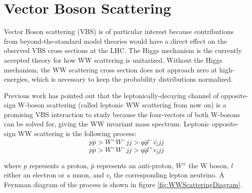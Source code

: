 \documentclass[10pt]{ucscthesisbs}
\begin{document}
\section{Vector Boson Scattering}
Vector Boson scattering (VBS) is of particular interest because contributions from beyond-the-standard model theories would have a direct effect on the observed VBS cross sections at the LHC. \cite{atlasnote2012} The Higgs mechanism is the currently accepted theory for how WW scattering is unitarized. Without the Higgs mechanism, the WW scattering cross section does not approach zero at high-energies, which is necessary to keep the probability distributions normalized. \cite{atlasnote2012} \par
Previous work has pointed out that the leptonically-decaying channel of opposite-sign W-boson scattering (called leptonic WW scattering from now on) is a promising VBS interaction to study because the four-vectors of both W-bosons can be solved for, giving the WW invariant mass spectrum. \cite{atlasnote2012} Leptonic opposite-sign WW scattering is the following process:
\begin{equation} \label{eq:wwscattering}
p \bar{p} > W^+ W^- j j > q\bar{q} l^- \bar{v_l} jj
\end{equation}
\begin{equation}
p \bar{p} > W^+ W^- j j > q\bar{q} l^+ v_l jj
\end{equation}

where $p$ represents a proton, $\bar{p}$ represents an anti-proton, $W^{\pm}$ the W boson, $l$ either an electron or a muon, and $v_l$ the corresponding lepton neutrino. A Feynman diagram of the process is shown in figure \ref{fig:WWScatteringDiagram}.
\end{document}

